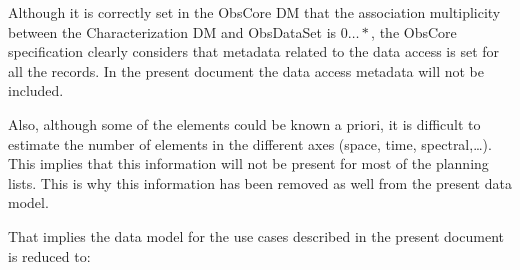 \documentclass[11pt,a4paper]{ivoa}
\begin{document}
Although it is correctly set in the ObsCore DM that the association multiplicity 
between the Characterization DM and ObsDataSet is $0\ldots\ast$, the ObsCore 
specification clearly considers that metadata related to the data access is set for 
all the records. In the present document the data access metadata will not be included.

Also, although some of the elements could be known a priori, it is difficult to 
estimate the number of elements in the different axes (space, time, spectral,\dots). 
This implies that this information will not be present for most of the planning lists. 
This is why this information has been removed as well from the present data model.

That implies the data model for the use cases described in the present document is 
reduced to:
\end{document}
